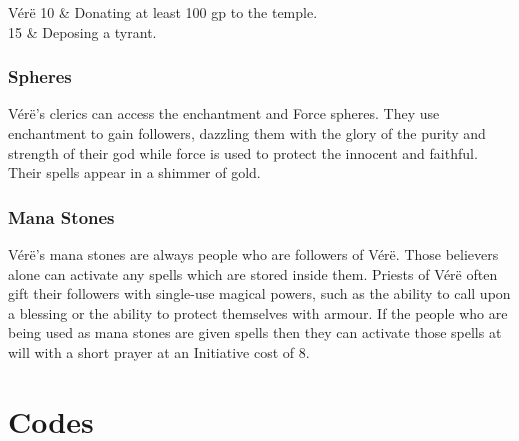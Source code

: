 \begin{multicols}{2}
\begin{xpchart}{V\'{e}r\"{e}}
	10 & Donating at least 100 gp to the temple. \\

	15 & Deposing a tyrant. \\

\end{xpchart}

\subsubsection{Spheres}

\noindent V\'{e}r\"{e}'s clerics can access the enchantment and Force spheres.
They use enchantment to gain followers, dazzling them with the glory of the purity and strength of their god while force is used to protect the innocent and faithful.
Their spells appear in a shimmer of gold.

\subsubsection{Mana Stones}

V\'{e}r\"{e}'s mana stones are always people who are followers of V\'{e}r\"{e}.
Those believers alone can activate any spells which are stored inside them.
Priests of V\'{e}r\"{e} often gift their followers with single-use magical powers, such as the ability to call upon a blessing or the ability to protect themselves with armour.
If the people who are being used as mana stones are given spells then they can activate those spells at will with a short prayer at an Initiative cost of 8.

\end{multicols}

\section{Codes}

